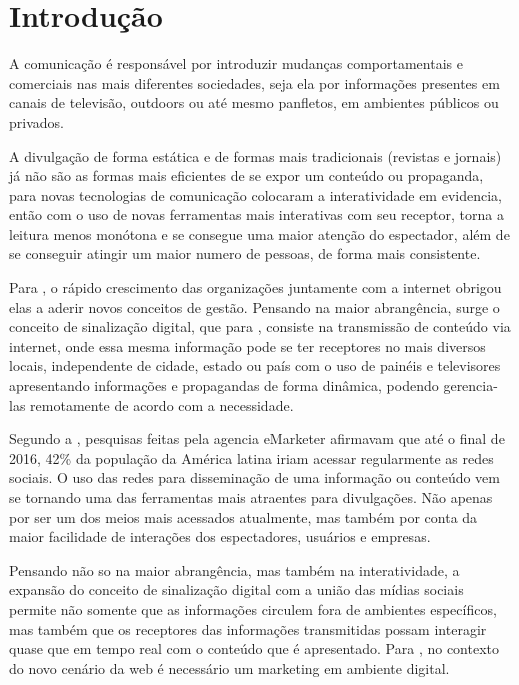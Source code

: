 \documentclass[
	12pt,				%
	openright,			%
	oneside,			%
	a4paper,			%
	english,			%
	french,				%
	spanish,			%
	brazil,				%
	]{abntex2}
\begin{document}
\frenchspacing 
\imprimircapa
\imprimirfolhaderosto*

\section*{Introdução}
	A comunicação é responsável por introduzir mudanças comportamentais e comerciais nas mais diferentes sociedades, seja ela por informações presentes em canais de televisão, outdoors ou até mesmo panfletos, em ambientes públicos ou privados.
	
	A divulgação de forma estática e de formas mais tradicionais (revistas e jornais) já não são as formas mais eficientes de se expor um conteúdo ou propaganda, para \cite{escobar2007} novas tecnologias de comunicação colocaram a interatividade em evidencia, então com o uso de novas ferramentas mais interativas com seu receptor, torna a leitura menos monótona e se consegue uma maior atenção do espectador, além de se conseguir atingir um maior numero de pessoas, de forma mais consistente.
	
	Para \cite{machado2010}, o rápido crescimento das organizações juntamente com a internet obrigou elas a aderir novos conceitos de gestão. Pensando na maior abrangência, surge o conceito de sinalização digital, que para \cite{machado2010}, consiste na transmissão de conteúdo via internet,  onde essa mesma informação pode se ter receptores no mais diversos locais, independente de cidade, estado ou país com o uso de painéis e televisores apresentando informações e propagandas de forma dinâmica, podendo gerencia-las remotamente de acordo com a necessidade.
	
	Segundo a \cite{forbes2016}, pesquisas feitas pela agencia eMarketer afirmavam que até o final de 2016, 42\% da população da América latina iriam acessar regularmente as redes sociais. O uso das redes para disseminação de uma informação ou conteúdo vem se tornando uma das ferramentas mais atraentes para divulgações. Não apenas por ser um dos meios mais acessados atualmente, mas também por conta da maior facilidade de interações dos espectadores, usuários e empresas.
	
	Pensando não so na maior abrangência, mas também na interatividade, a expansão do conceito de sinalização digital com a união das mídias sociais permite não somente que as informações circulem fora de ambientes específicos, mas também que os receptores das informações transmitidas possam interagir quase que em tempo real com o conteúdo que é apresentado. Para \cite{santos2014}, no contexto do novo cenário da web é necessário um marketing em ambiente digital. 
	
\end{document}
